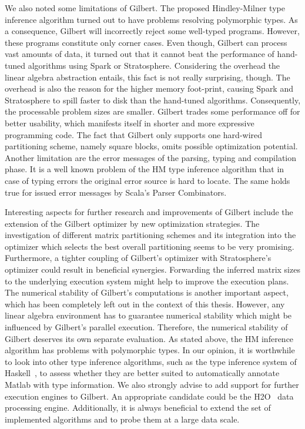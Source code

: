 We also noted some limitations of Gilbert.
The proposed Hindley-Milner type inference algorithm turned out to have problems resolving polymorphic types.
As a consequence, Gilbert will incorrectly reject some well-typed programs.
However, these programs constitute only corner cases.
Even though, Gilbert can process vast amounts of data, it turned out that it cannot beat the performance of hand-tuned algorithms using Spark or Stratosphere.
Considering the overhead the linear algebra abstraction entails, this fact is not really surprising, though.
The overhead is also the reason for the higher memory foot-print, causing Spark and Stratosphere to spill faster to disk than the hand-tuned algorithms.
Consequently, the processable problem sizes are smaller.
Gilbert trades some performance off for better usability, which manifests itself in shorter and more expressive programming code.
The fact that Gilbert only supports one hard-wired partitioning scheme, namely square blocks, omits possible optimization potential.
Another limitation are the error messages of the parsing, typing and compilation phase.
It is a well known problem of the HM type inference algorithm that in case of typing errors the original error source is hard to locate.
The same holds true for issued error messages by Scala's Parser Combinators.

Interesting aspects for further research and improvements of Gilbert include the extension of the Gilbert optimizer by new optimization strategies.
The investigation of different matrix partitioning schemes and its integration into the optimizer which selects the best overall partitioning seems to be very promising.
Furthermore, a tighter coupling of Gilbert's optimizer with Stratosphere's optimizer could result in beneficial synergies.
Forwarding the inferred matrix sizes to the underlying execution system might help to improve the execution plans.
The numerical stability of Gilbert's computations is another important aspect, which has been completely left out in the context of this thesis.
However, any linear algebra environment has to guarantee numerical stability which might be influenced by Gilbert's parallel execution.
Therefore, the numerical stability of Gilbert deserves its own separate evaluation.
As stated above, the HM inference algorithm has problems with polymorphic types.
In our opinion, it is worthwhile to look into other type inference algorithms, such as the type inference system of Haskell~\cite{haskell}, to assess whether they are better suited to automatically annotate Matlab with type information.
We also strongly advise to add support for further execution engines to Gilbert.
An appropriate candidate could be the H2O~\cite{h2o} data processing engine.
Additionally, it is always beneficial to extend the set of implemented algorithms and to probe them at a large data scale.

